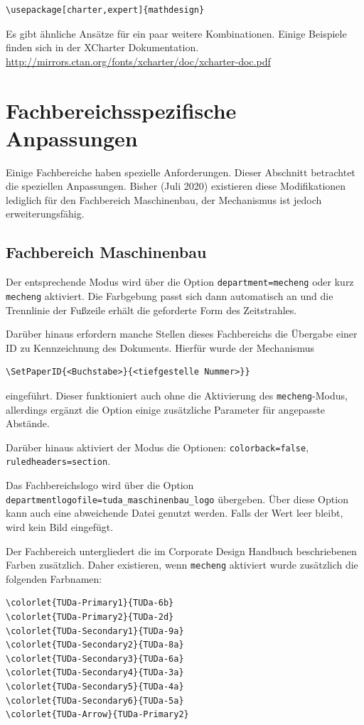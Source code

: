 \documentclass[
	ngerman,%
	accentcolor=9c,%
]{tudapub}
\newcommand*{\code}[1]{\texttt{#1}}
\begin{document}
\begin{verbatim}
\usepackage[charter,expert]{mathdesign}
\end{verbatim}

Es gibt ähnliche Ansätze für ein paar weitere Kombinationen. Einige Beispiele finden sich in der XCharter Dokumentation. \url{http://mirrors.ctan.org/fonts/xcharter/doc/xcharter-doc.pdf}

\section{Fachbereichsspezifische Anpassungen}
Einige Fachbereiche haben spezielle Anforderungen. Dieser Abschnitt betrachtet die speziellen Anpassungen. Bisher (Juli 2020) existieren diese Modifikationen lediglich für den Fachbereich Maschinenbau, der Mechanismus ist jedoch erweiterungsfähig.

\subsection{Fachbereich Maschinenbau}
Der entsprechende Modus wird über die Option \code{department=mecheng} oder kurz \code{mecheng} aktiviert. Die Farbgebung passt sich dann automatisch an und die Trennlinie der Fußzeile erhält die geforderte Form des Zeitstrahles.

Darüber hinaus erfordern manche Stellen dieses Fachbereichs die Übergabe einer ID zu Kennzeichnung des Dokuments. Hierfür wurde der Mechanismus
\begin{verbatim}
\SetPaperID{<Buchstabe>}{<tiefgestelle Nummer>}}
\end{verbatim}
eingeführt.
Dieser funktioniert auch ohne die Aktivierung des \code{mecheng}-Modus, allerdings ergänzt die Option einige zusätzliche Parameter für angepasste Abstände.

Darüber hinaus aktiviert der Modus die Optionen:
\code{colorback=false}, \code{ruledheaders=section}.

Das Fachbereichslogo wird über die Option \verb+departmentlogofile=tuda_maschinenbau_logo+ übergeben. Über diese Option kann auch eine abweichende Datei genutzt werden. Falls der Wert leer bleibt, wird kein Bild eingefügt.

Der Fachbereich untergliedert die im Corporate Design Handbuch beschriebenen Farben zusätzlich. Daher existieren, wenn \code{mecheng} aktiviert wurde zusätzlich die folgenden Farbnamen:

\begin{verbatim}
\colorlet{TUDa-Primary1}{TUDa-6b}
\colorlet{TUDa-Primary2}{TUDa-2d}
\colorlet{TUDa-Secondary1}{TUDa-9a}
\colorlet{TUDa-Secondary2}{TUDa-8a}
\colorlet{TUDa-Secondary3}{TUDa-6a}
\colorlet{TUDa-Secondary4}{TUDa-3a}
\colorlet{TUDa-Secondary5}{TUDa-4a}
\colorlet{TUDa-Secondary6}{TUDa-5a}
\colorlet{TUDa-Arrow}{TUDa-Primary2}
\end{verbatim}
\end{document}

